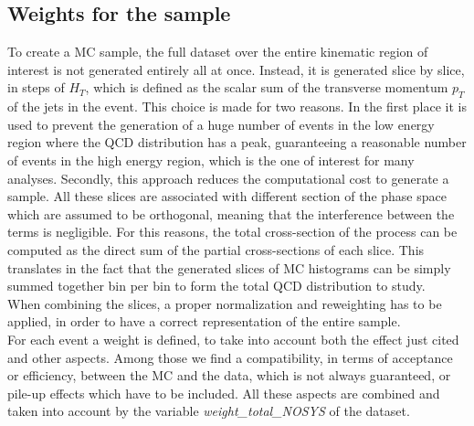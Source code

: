\subsection{Weights for the sample}\label{sec:ADJJ/dataset/weights}

To create a MC sample, the full dataset over the entire kinematic region of interest is not generated entirely all at once. 
Instead, it is generated slice by slice, in steps of $H_T$, which is defined as the scalar sum of the transverse momentum $p_T$ of the jets in the event. 
This choice is made for two reasons.
In the first place it is used to prevent the generation of a huge number of events in the low energy region where the QCD distribution has a peak, guaranteeing a reasonable number of events in the high energy region, which is the one of interest for many analyses.
Secondly, this approach reduces the computational cost to generate a sample. 
All these slices are associated with different section of the phase space which are assumed to be orthogonal, meaning that the interference between the terms is negligible.
For this reasons, the total cross-section of the process can be computed as the direct sum of the partial cross-sections of each slice.
This translates in the fact that the generated slices of MC histograms can be simply summed together bin per bin to form the total QCD distribution to study.\\
When combining the slices, a proper normalization and reweighting has to be applied, in order to have a correct representation of the entire sample. \\
For each event a weight is defined, to take into account both the effect just cited and other aspects.
Among those we find a compatibility, in terms of acceptance or efficiency, between the MC and the data, which is not always guaranteed, or pile-up effects which have to be included.
All these aspects are combined and taken into account by the variable \textit{weight\_total\_NOSYS} of the dataset. 


